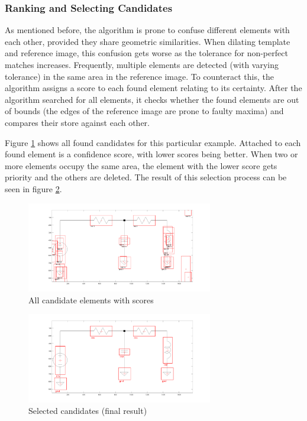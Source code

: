 \documentclass[10pt,twocolumn,letterpaper]{article}
\begin{document}
\subsubsection*{Ranking and Selecting Candidates}

As mentioned before, the algorithm is prone to confuse different elements with each other, provided they share geometric similarities. When dilating template and reference image, this confusion gets worse as the tolerance for non-perfect matches increases. Frequently, multiple elements are detected (with varying tolerance) in the same area in the reference image. To counteract this, the algorithm assigns a score to each found element relating to its certainty. After the algorithm searched for all elements, it checks whether the found elements are out of bounds (the edges of the reference image are prone to faulty maxima) and compares their store against each other. 
\par
Figure \ref{fig:detRS1} shows all found candidates for this particular example. Attached to each found element is a confidence score, with lower scores being better. When two or more elements occupy the same area, the element with the lower score gets priority and the others are deleted. The result of this selection process can be seen in figure \ref{fig:detRS2}.

\begin{figure}[!ht]
\includegraphics[width = 3.2in]{img/detRS1.png}
\caption{All candidate elements with scores}
\label{fig:detRS1}
\end{figure}
\par

\begin{figure}[!ht]
\includegraphics[width = 3.2in]{img/detRS2.png}
\caption{Selected candidates (final result)}
\label{fig:detRS2}
\end{figure}
\end{document}
